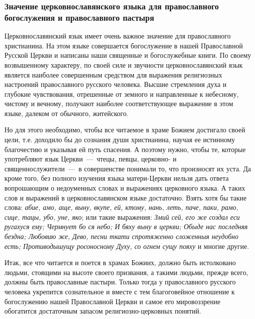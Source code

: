 \documentclass[11pt,a4paper,oneside]{memoir}
\begin{document}
        \subsubsection[Значение церковнославянского языка]{Значение
          церковнославянского языка для православного богослужения и
        православного пастыря}

        Церковнославянский язык имеет очень важное значение для
        православного христианина. На этом языке совершается
        богослужение в нашей Православной Русской Церкви и написаны
        наши священные и богослужебные книги. По своему возвышенному
        характеру, по своей силе и звучности церковнославянский язык
        является наиболее совершенным средством для выражения
        религиозных настроений православного русского человека.
        Высшие стремления духа и глубокие чувствования, отрешенные от
        земного и направленные к небесному, чистому и вечному,
        получают наиболее соответствующее выражение в этом языке,
        далеком от обычного, житейского.

        Но для этого необходимо, чтобы все читаемое в храме Божием
        достигало своей цели, т.е. доходило бы до сознания души
        христианина, научая ее истинному благочестию и указывая ей
        путь спасения. А поэтому нужно, чтобы те, которые употребляют
        язык Церкви~---~чтецы, певцы, церковно- и
        священнослужители~---~в совершенстве понимали то, что
        произносят их уста. Да кроме того, без полного изучения языка
        матери-Церкви нельзя дать ответа вопрошающим о недоуменных
        словах и выражениях церковного языка. А таких слов и
        выражений в церковнославянском языке достаточно. Взять хотя
        бы такие слова: \emph{абие, амо, аще, выну, вкупе, ей, ктому,
        нань, леть, паче, паки, рамо, сице, тацы, убо, уне, яко}; или
        такие выражения: \emph{Змий сей, его же создал еси ругахуся
          ему; Чермнует бо ся небо; И бяху выну в церкви; Обыде нас
          последняя бездна; Любовию же, Дево, песни ткати спротяженно
          сложенныя неудобно есть; Противодышущу росоносному Духу, со
        огнем сущу пояху} и многие другие.

        Итак, все что читается и поется в храмах Божиих, должно быть
        истолковано людьми, стоящими на высоте своего призвания, а
        такими людьми, прежде всего, должны быть православные
        пастыри. Только тогда у православного русского человека
        укрепится сознательное и вместе с тем благоговейное отношение
        к богослужению нашей Православной Церкви и самое его
        мировоззрение обогатится достаточным запасом
        религиозно-церковных понятий.
\end{document}
